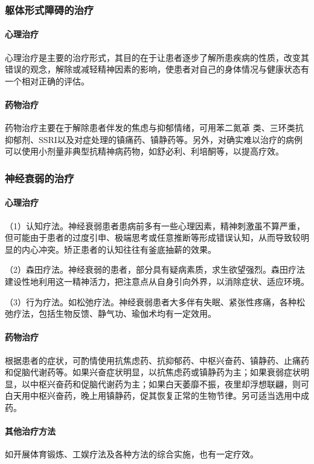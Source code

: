 \subsubsection{躯体形式障碍的治疗}
\paragraph{心理治疗}

心理治疗是主要的治疗形式，其目的在于让患者逐步了解所患疾病的性质，改变其错误的观念，解除或减轻精神因素的影响，使患者对自己的身体情况与健康状态有一个相对正确的评估。
\paragraph{药物治疗}

药物治疗主要在于解除患者伴发的焦虑与抑郁情绪，可用苯二氮䓬
类、三环类抗抑郁剂、SSRI以及对症处理的镇痛药、镇静药等。另外，对确实难以治疗的病例可以使用小剂量非典型抗精神病药物，如舒必利、利培酮等，以提高疗效。

\subsubsection{神经衰弱的治疗}
\paragraph{心理治疗}

（1）认知疗法。神经衰弱患者患病前多有一些心理因素，精神刺激虽不算严重，但可能由于患者的过度引申、极端思考或任意推断等形成错误认知，从而导致较明显的内心冲突。矫正患者的认知往往有釜底抽薪的效果。

（2）森田疗法。神经衰弱的患者，部分具有疑病素质，求生欲望强烈。森田疗法建设性地利用这一精神活力，把注意点从自身引向外界，以消除症状、适应环境。

（3）行为疗法。如松弛疗法。神经衰弱患者大多伴有失眠、紧张性疼痛，各种松弛疗法，包括生物反馈、静气功、瑜伽术均有一定效用。
\paragraph{药物治疗}

根据患者的症状，可酌情使用抗焦虑药、抗抑郁药、中枢兴奋药、镇静药、止痛药和促脑代谢药等。如果兴奋症状明显，以抗焦虑药或镇静药为主；如果衰弱症状明显，以中枢兴奋药和促脑代谢药为主；如果白天萎靡不振，夜里却浮想联翩，则可白天用中枢兴奋药，晚上用镇静药，促其恢复正常的生物节律。另可适当选用中成药。
\paragraph{其他治疗方法}

如开展体育锻炼、工娱疗法及各种方法的综合实施，也有一定疗效。